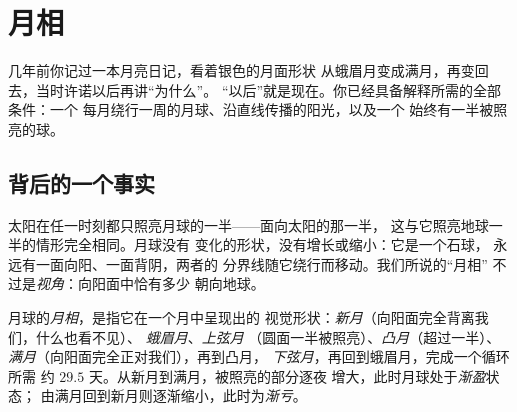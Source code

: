 \chapter{月相}\label{ch:g7:moon-phases}

几年前你记过一本月亮日记，看着银色的月面形状
从蛾眉月变成满月，再变回去，当时许诺以后再讲“为什么”。
“以后”就是现在。你已经具备解释所需的全部条件：一个
每月绕行一周的月球、沿直线传播的阳光，以及一个
始终有一半被照亮的球。

\section{背后的一个事实}

\begin{proposition}[始终有一半被照亮]\label{prop:g7:moon-phases:halflit}
太阳在任一时刻都只照亮月球的一半——面向太阳的那一半，
这与它照亮地球一半的情形完全相同。月球没有
变化的形状，没有增长或缩小：它是一个石球，
永远有一面向阳、一面背阴，两者的
分界线随它绕行而移动。我们所说的“月相”
不过是\emph{视角}：向阳面中恰有多少
朝向地球。
\end{proposition}

\begin{definition}[月相]\label{def:g7:moon-phases:phases}
月球的\emph{月相}，是指它在一个月中呈现出的
视觉形状：\emph{新月}（向阳面完全背离我们，什么也看不见）、
\emph{蛾眉月}、\emph{上弦月}
（圆面一半被照亮）、\emph{凸月}（超过一半）、
\emph{满月}（向阳面完全正对我们），再到凸月，
\emph{下弦月}，再回到蛾眉月，完成一个循环所需
约 $29.5$ 天。从新月到满月，被照亮的部分逐夜
增大，此时月球处于\emph{渐盈}状态；
由满月回到新月则逐渐缩小，此时为\emph{渐亏}。
\end{definition}

